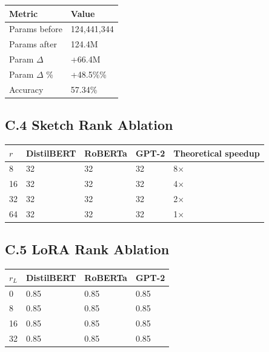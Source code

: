 \begin{table}[H]
\centering
\small
\begin{tabular}{ll}
\toprule
\textbf{Metric} & \textbf{Value} \\
\midrule
Params before & 124,441,344 \\
Params after & 124.4M \\
Param $\Delta$ & +66.4M \\
Param $\Delta$ \% & +48.5\%\% \\
Accuracy & 57.34\% \\
\bottomrule
\end{tabular}
\end{table}

\subsection{C.4 Sketch Rank Ablation}

\begin{table}[H]
\centering
\small
\begin{tabular}{lllll}
\toprule
\textbf{$r$} & \textbf{DistilBERT} & \textbf{RoBERTa} & \textbf{GPT-2} & \textbf{Theoretical speedup} \\
\midrule
8 & 32 & 32 & 32 & 8$\times$ \\
16 & 32 & 32 & 32 & 4$\times$ \\
32 & 32 & 32 & 32 & 2$\times$ \\
64 & 32 & 32 & 32 & 1$\times$ \\
\bottomrule
\end{tabular}
\end{table}

\subsection{C.5 LoRA Rank Ablation}

\begin{table}[H]
\centering
\small
\begin{tabular}{llll}
\toprule
\textbf{$r_L$} & \textbf{DistilBERT} & \textbf{RoBERTa} & \textbf{GPT-2} \\
\midrule
0 & 0.85 & 0.85 & 0.85 \\
8 & 0.85 & 0.85 & 0.85 \\
16 & 0.85 & 0.85 & 0.85 \\
32 & 0.85 & 0.85 & 0.85 \\
\bottomrule
\end{tabular}
\end{table}

